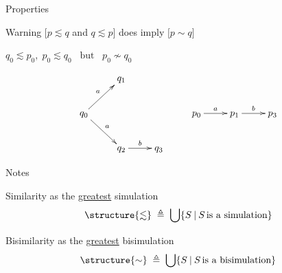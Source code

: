 \documentclass[aspectratio=169]{beamer}
\begin{document}
\begin{slide}{Properties}

\small

\begin{alertblock}{Warning}
\centering
$\Big[p\lesssim q$ and $q\lesssim p\Big]$ does  imply
  $\Big[p \sim q\Big]$
\end{alertblock}

\begin{example}
\begin{center}
$q_0 \lesssim p_0,\;  p_0 \lesssim q_0\;\;\; \text{but}\;\;\;  p_0 \not \sim q_0$
\end{center}

\begin{equation*}
\xymatrix{
& q_1  & & & & \\
q_0 \ar[ru]^{a} \ar[rd]^{a} &  & & p_0 \ar[r]^{a} & p_1 \ar[r]^{b} & p_3\\
& q_2  \ar[r]^{b} & q_3 &       &        &                          
}
\end{equation*}
\end{example}
\end{slide}




\begin{slide}{Notes}
\small
\begin{block}{Similarity as the \underline{greatest} simulation}
\begin{equation*}
\structure{\lesssim}\;  \deff\; \bigcup \setdef{S}{S\, \text{is a simulation}} 
\end{equation*}
\end{block}
\begin{block}{Bisimilarity as the \underline{greatest} bisimulation}
\begin{equation*}
\structure{\sim}\;  \deff\; \bigcup \setdef{S}{S\, \text{is a bisimulation}} 
\end{equation*}
\end{block}
\end{slide}
\end{document}

